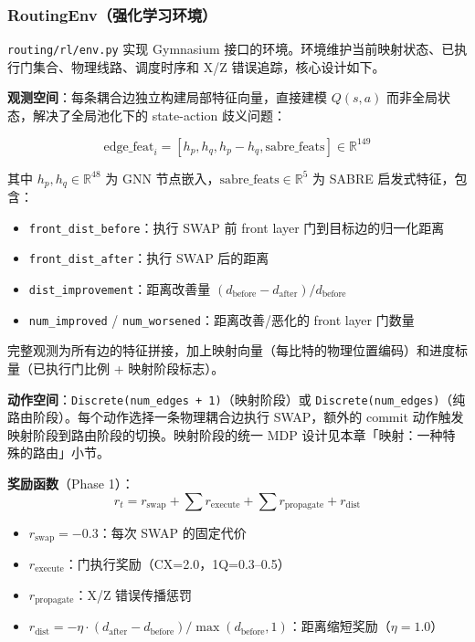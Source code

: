 \subsubsection{RoutingEnv（强化学习环境）}

\texttt{routing/rl/env.py} 实现 Gymnasium 接口的环境。环境维护当前映射状态、已执行门集合、物理线路、调度时序和 X/Z 错误追踪，核心设计如下。

\textbf{观测空间}：每条耦合边独立构建局部特征向量，直接建模 $Q(s,a)$ 而非全局状态，解决了全局池化下的 state-action 歧义问题：

\[
\text{edge\_feat}_i = [h_p, h_q, h_p-h_q, \text{sabre\_feats}] \in \mathbb{R}^{149}
\]

其中 $h_p, h_q \in \mathbb{R}^{48}$ 为 GNN 节点嵌入，$\text{sabre\_feats} \in \mathbb{R}^5$ 为 SABRE 启发式特征，包含：
\begin{itemize}
  \item \texttt{front\_dist\_before}：执行 SWAP 前 front layer 门到目标边的归一化距离
  \item \texttt{front\_dist\_after}：执行 SWAP 后的距离
  \item \texttt{dist\_improvement}：距离改善量 $(d_{\text{before}} - d_{\text{after}}) / d_{\text{before}}$
  \item \texttt{num\_improved} / \texttt{num\_worsened}：距离改善/恶化的 front layer 门数量
\end{itemize}

完整观测为所有边的特征拼接，加上映射向量（每比特的物理位置编码）和进度标量（已执行门比例 + 映射阶段标志）。

\textbf{动作空间}：\texttt{Discrete(num\_edges + 1)}（映射阶段）或 \texttt{Discrete(num\_edges)}（纯路由阶段）。每个动作选择一条物理耦合边执行 SWAP，额外的 commit 动作触发映射阶段到路由阶段的切换。映射阶段的统一 MDP 设计见本章「映射：一种特殊的路由」小节。

\textbf{奖励函数}（Phase 1）：
\[
r_t = r_{\text{swap}} + \sum r_{\text{execute}} + \sum r_{\text{propagate}} + r_{\text{dist}}
\]
\begin{itemize}
  \item $r_{\text{swap}} = -0.3$：每次 SWAP 的固定代价
  \item $r_{\text{execute}}$：门执行奖励（CX=2.0，1Q=0.3--0.5）
  \item $r_{\text{propagate}}$：X/Z 错误传播惩罚
  \item $r_{\text{dist}} = -\eta \cdot (d_{\text{after}} - d_{\text{before}}) / \max(d_{\text{before}}, 1)$：距离缩短奖励（$\eta = 1.0$）
\end{itemize}

